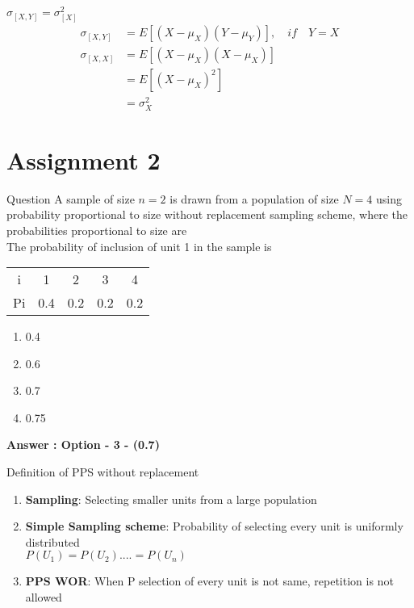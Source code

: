 \documentclass[10pt]{beamer}
\begin{document}
\begin{frame}{$\sigma_{[X,Y]}= \sigma_{[X]}^2$}
        \begin{align*}
        \sigma_{[X,Y]} &= E[(X-\mu_X) (Y-\mu_Y)],
        \quad \textit{if}\quad Y=X \\
        \sigma_{[X,X]} &= E[(X-\mu_X) (X-\mu_X)]\\
        &=E[(X-\mu_X)^2]\\
        &=\sigma_X^2
    \end{align*}
\end{frame}
\section{Assignment 2}

\begin{frame}[fragile]{Question}
A sample of size $n = 2$ is drawn from a population of size $N = 4$ using probability proportional to size
without replacement sampling scheme, where the probabilities proportional to size are\\
The probability of inclusion of unit 1 in the sample is
\begin{center}
\begin{tabular}{ c c c c c}
 i  & 1   & 2   & 3   & 4   \\ 
 Pi & 0.4 & 0.2 & 0.2 & 0.2 \\  
\end{tabular}
\end{center}
\begin{enumerate}
    \item 0.4 
    \item 0.6
    \item 0.7
    \item 0.75
\end{enumerate}
\large \textbf{Answer : Option - 3 - (0.7)}\\
\end{frame}

\begin{frame}{Definition of PPS without replacement}
\begin{enumerate}
    \item \large \textbf {Sampling}: Selecting smaller units from a large population
    \item \large \textbf{Simple Sampling scheme}: Probability of selecting every unit is uniformly distributed  \\
     $P(U_1) = P(U_2) .... = P(U_n)$\\
    \item  \large \textbf{PPS WOR}: When P selection of every unit is not same,
    repetition is not allowed
\end{enumerate}
\end{frame}
\end{document}
